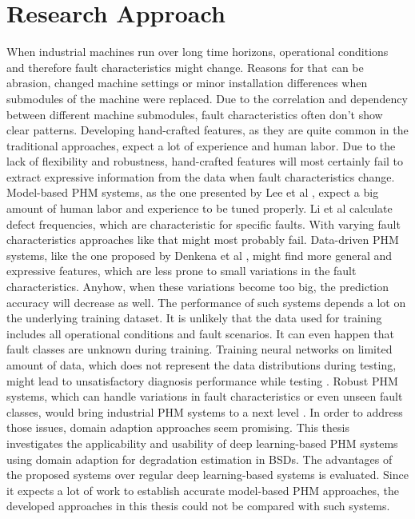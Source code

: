 \chapter{Research Approach}\label{chapter:research_approach}

When industrial machines run over long time horizons, operational conditions and therefore fault characteristics might change. Reasons for that can be abrasion, changed machine settings or minor installation differences when submodules of the machine were replaced. Due to the correlation and dependency between different machine submodules, fault characteristics often don't show clear patterns. Developing hand-crafted features, as they are quite common in the traditional approaches, expect a lot of experience and human labor. Due to the lack of flexibility and robustness, hand-crafted features will most certainly fail to extract expressive information from the data when fault characteristics change. Model-based PHM systems, as the one presented by Lee et al \cite{Lee2015}, expect a big amount of human labor and experience to be tuned properly. Li et al calculate defect frequencies, which are characteristic for specific faults. With varying fault characteristics approaches like that might most probably fail. Data-driven PHM systems, like the one proposed by Denkena et al \cite{Denkena2021}, might find more general and expressive features, which are less prone to small variations in the fault characteristics. Anyhow, when these variations become too big, the prediction accuracy will decrease as well. The performance of such systems depends a lot on the underlying training dataset. It is unlikely that the data used for training includes all operational conditions and fault scenarios. It can even happen that fault classes are unknown during training. Training neural networks on limited amount of data, which does not represent the data distributions during testing, might lead to unsatisfactory diagnosis performance while testing \cite{AZAMFAR2020103932}. Robust PHM systems, which can handle variations in fault characteristics or even unseen fault classes, would bring industrial PHM systems to a next level \cite{Michau2017}. In order to address those issues, domain adaption approaches seem promising. This thesis investigates the applicability and usability of deep learning-based PHM systems using domain adaption for degradation estimation in BSDs. The advantages of the proposed systems over regular deep learning-based systems is evaluated. Since it expects a lot of work to establish accurate model-based PHM approaches, the developed approaches in this thesis could not be compared with such systems.

